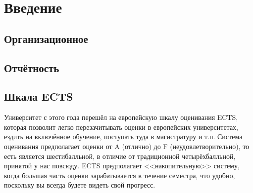 \documentclass{../../slide-style}
\author{Юрий Литвинов\\\small{yurii.litvinov@gmail.com}}
\begin{document}
\maketitle
\thispagestyle{empty}

\section{Введение}

\subsection{Организационное}


\subsection{Отчётность}


\subsection{Шкала ECTS}

Университет с этого года перешёл на европейскую шкалу оценивания ECTS, которая позволит легко перезачитывать оценки в европейских университетах, ездить на включённое обучение, поступать туда в магистратуру и т.п. Система оценивания предполагает оценки от A (отлично) до F (неудовлетворительно), то есть является шестибалльной, в отличие от традиционной четырёхбалльной, принятой у нас повсюду. ECTS предполагает <<накопительную>> систему, когда большая часть оценки зарабатывается в течение семестра, что удобно, поскольку вы всегда будете видеть свой прогресс.
\end{document}
